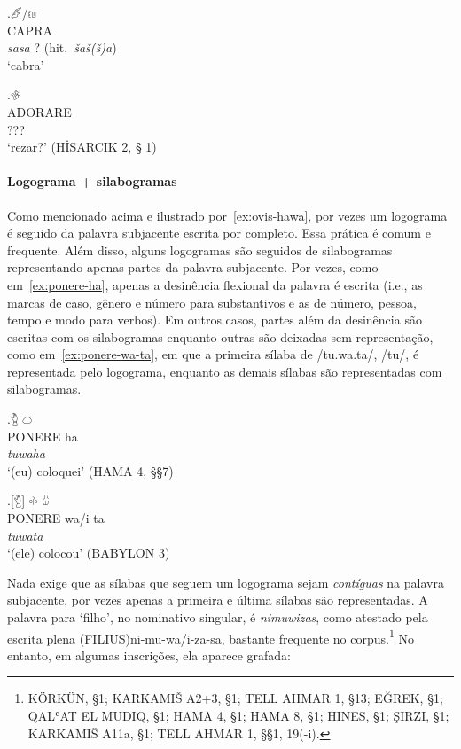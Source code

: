 \exg.\label{ex:capra}\Large 𔑶\slash{}𔑷\\
CAPRA\\
\emph{sasa}{ }? (hit.\ \emph{šaš{(š)}a})\\
`cabra'


\exg.\label{ex:adorare}\Large 𔐅  \\
ADORARE\\
???\\
`rezar?' (HİSARCIK 2, § 1)

\paragraph{Logograma + silabogramas}
Como mencionado acima e ilustrado por~\ref{ex:ovis-hawa}, por vezes um logograma
é seguido da palavra subjacente escrita por completo. Essa prática é comum e
frequente.
Além disso, alguns logogramas são seguidos de silabogramas representando apenas
partes da palavra subjacente.
Por vezes, como em~\ref{ex:ponere-ha}, apenas a desinência flexional da
palavra é escrita (i.e., as marcas de caso, gênero e número para substantivos e
as de número, pessoa, tempo e modo para verbos).
Em outros casos, partes além da desinência são escritas com os silabogramas
enquanto outras são deixadas sem representação, como em~\ref{ex:ponere-wa-ta},
em que a primeira sílaba de /tu.wa.ta/, /tu/, é representada pelo logograma,
enquanto as demais sílabas são representadas com silabogramas.

\exg.\label{ex:ponere-ha}\Large 𔑇 \Large 𔓷\\
PONERE ha\\
\emph{tuwaha}\\
`(eu) coloquei' (HAMA 4, §§7)

\exg.\label{ex:ponere-wa-ta}\Large [𔑇] \Large 𔗬 \Large 𔑰\\
PONERE wa/i ta\\
\emph{tuwata}\\
`(ele) colocou' (BABYLON 3)


\noindent Nada exige que as sílabas que seguem um logograma sejam
\emph{contíguas} na palavra subjacente, por vezes apenas a primeira e última
sílabas são representadas.
A palavra para `filho', no nominativo singular, é \emph{nimuwizas}, como
atestado pela escrita plena {(FILIUS)}ni-mu-wa/i-za-sa, bastante frequente no
corpus.\footnote{KÖRKÜN, §1; KARKAMIŠ A2+3, §1; TELL AHMAR 1, §13; EĞREK, §1;
	QALʿAT EL MUDIQ, §1; HAMA 4, §1; HAMA 8, §1; HINES, §1; ŞIRZI, §1;
	KARKAMIŠ A11a, §1; TELL AHMAR 1, §§1, 19(-i).}
No entanto, em algumas inscrições, ela aparece grafada:

